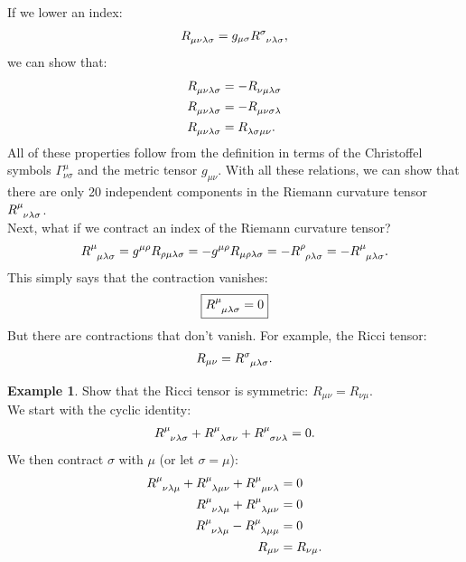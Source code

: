 \documentclass{book}
\theoremstyle{definition}
\newtheorem{exmp}{Example}[section]
\begin{document}
If we lower an index:
\begin{align*}
\tensor{R}{_{\mu\nu\lambda\sigma}} = g_{\mu\sigma}\tensor{R}{^{\sigma}_{\nu\lambda\sigma}},
\end{align*} 
we can show that:
\begin{align*}
\tensor{R}{_{\mu\nu\lambda\sigma}} &= -\tensor{R}{_{\nu\mu\lambda\sigma}}\\
\tensor{R}{_{\mu\nu\lambda\sigma}} &= -\tensor{R}{_{\mu\nu\sigma\lambda}}\\
\tensor{R}{_{\mu\nu\lambda\sigma}} &= \tensor{R}{_{\lambda\sigma\mu\nu}}.
\end{align*}
All of these properties follow from the definition in terms of the Christoffel symbols $\Gamma^{\mu}_{\nu\sigma}$ and the metric tensor $g_{\mu\nu}$. With all these relations, we can show that there are only 20 independent components in the Riemann curvature tensor $\tensor{R}{^{\mu}_{\nu\lambda\sigma}}$.\\

Next, what if we contract an index of the Riemann curvature tensor? 
\begin{align*}
\tensor{R}{^{\mu}_{\mu\lambda\sigma}} = g^{\mu\rho}R_{\rho\mu\lambda\sigma} = -g^{\mu\rho}R_{\mu\rho\lambda\sigma} = -\tensor{R}{^{\rho}_{\rho\lambda\sigma}} = -\tensor{R}{^\mu_{\mu\lambda\sigma}}.
\end{align*}
This simply says that the contraction vanishes:
\begin{align*}
\boxed{\tensor{R}{^{\mu}_{\mu\lambda\sigma}} = 0}
\end{align*}
But there are contractions that don't vanish. For example, the Ricci tensor:
\begin{align*}
R_{\mu\nu} = \tensor{R}{^{\sigma}_{\mu\lambda\sigma}}. 
\end{align*}

\begin{exmp}
	Show that the Ricci tensor is symmetric: $R_{\mu\nu} = R_{\nu\mu}$.\\
	
	We start with the cyclic identity: 
	\begin{align*}
	\tensor{R}{^{\mu}_{\nu\lambda\sigma}} + \tensor{R}{^{\mu}_{\lambda\sigma\nu}} + \tensor{R}{^{\mu}_{\sigma\nu\lambda}} = 0.
	\end{align*}
	We then contract $\sigma$ with $\mu$ (or let $\sigma = \mu$):
	\begin{align*}
	\tensor{R}{^{\mu}_{\nu\lambda\mu}} + \tensor{R}{^{\mu}_{\lambda\mu\nu}} + \tensor{R}{^{\mu}_{\mu\nu\lambda}} &= 0\\
	\tensor{R}{^{\mu}_{\nu\lambda\mu}} + \tensor{R}{^{\mu}_{\lambda\mu\nu}} &= 0\\
	\tensor{R}{^{\mu}_{\nu\lambda\mu}} - \tensor{R}{^{\mu}_{\lambda\mu\mu}} &= 0\\
	R_{\mu\nu} &= R_{\nu\mu}.
	\end{align*}
	
\end{exmp}
\end{document}

